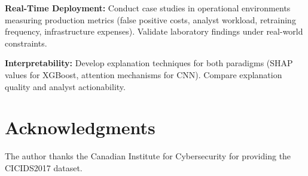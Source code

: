 \documentclass[10pt,twocolumn]{article}
\begin{document}
\textbf{Real-Time Deployment:} Conduct case studies in operational environments measuring production metrics (false positive costs, analyst workload, retraining frequency, infrastructure expenses). Validate laboratory findings under real-world constraints.

\textbf{Interpretability:} Develop explanation techniques for both paradigms (SHAP values for XGBoost, attention mechanisms for CNN). Compare explanation quality and analyst actionability.

\section*{Acknowledgments}

The author thanks the Canadian Institute for Cybersecurity for providing the CICIDS2017 dataset.
\end{document}
